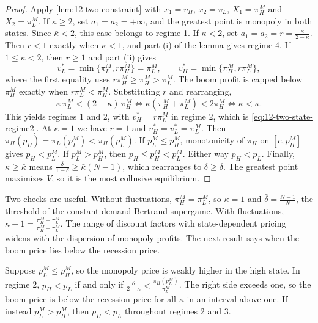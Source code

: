 \begin{proof}
Apply \cref{lem:12-two-constraint} with $x_1 = v_H$, $x_2 = v_L$, $X_1 = \pi_H^M$ and $X_2 = \pi_L^M$. If
$\kappa \ge 2$, set $a_1 = a_2 = +\infty$, and the greatest point is monopoly in both states. Since $\bar\kappa < 2$,
this case belongs to regime 1. If $\kappa < 2$, set $a_1 = a_2 = r = \frac{\kappa}{2-\kappa}$. Then $r < 1$ exactly
when $\kappa < 1$, and part (i) of the lemma gives regime 4. If $1 \le \kappa < 2$, then $r \ge 1$ and part (ii) gives
\begin{equation*}
v_L^* = \min\{\pi_L^M, r\pi_H^M\} = \pi_L^M, \qquad v_H^* = \min\{\pi_H^M, r\pi_L^M\},
\end{equation*}
where the first equality uses $r\pi_H^M \ge \pi_H^M > \pi_L^M$. The boom profit is capped below $\pi_H^M$ exactly
when $r\pi_L^M < \pi_H^M$. Substituting $r$ and rearranging,
\begin{equation*}
\kappa\,\pi_L^M < (2-\kappa)\,\pi_H^M \iff \kappa\left(\pi_H^M + \pi_L^M\right) < 2\pi_H^M \iff \kappa < \bar\kappa .
\end{equation*}
This yields regimes 1 and 2, with $v_H^* = r\pi_L^M$ in regime 2, which is \eqref{eq:12-two-state-regime2}. At
$\kappa = 1$ we have $r = 1$ and $v_H^* = v_L^* = \pi_L^M$. Then $\pi_H(p_H) = \pi_L(p_L^M) < \pi_H(p_L^M)$. If
$p_L^M \le p_H^M$, monotonicity of $\pi_H$ on $[c, p_H^M]$ gives $p_H < p_L^M$. If $p_L^M > p_H^M$, then
$p_H \le p_H^M < p_L^M$. Either way $p_H < p_L$. Finally, $\kappa \ge \bar\kappa$ means
$\frac{\delta}{1-\delta} \ge \bar\kappa(N-1)$, which rearranges to $\delta \ge \bar\delta$. The greatest point maximizes
$V$, so it is the most collusive equilibrium.
\end{proof}

Two checks are useful. Without fluctuations, $\pi_H^M = \pi_L^M$, so $\bar\kappa = 1$ and $\bar\delta = \frac{N-1}{N}$,
the threshold of the constant-demand Bertrand supergame. With fluctuations, $\bar\kappa - 1 =
\frac{\pi_H^M - \pi_L^M}{\pi_H^M + \pi_L^M}$. The range of discount factors with state-dependent pricing widens with the
dispersion of monopoly profits. The next result says when the boom price lies below the recession price.

\begin{corollary}\label{cor:12-rs-countercyclical}
Suppose $p_L^M \le p_H^M$, so the monopoly price is weakly higher in the high state. In regime 2, $p_H < p_L$ if and
only if $\frac{\kappa}{2-\kappa} < \frac{\pi_H(p_L^M)}{\pi_L^M}$. The right side exceeds one, so the boom price is below the
recession price for all $\kappa$ in an interval above one. If instead $p_L^M > p_H^M$, then $p_H < p_L$ throughout
regimes 2 and 3.
\end{corollary}

